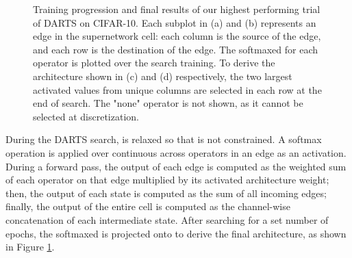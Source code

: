 \documentclass[letterpaper]{article} \usepackage{aaai22}  \usepackage{times}  \usepackage{helvet}  \usepackage{courier}  \usepackage[hyphens]{url}  \usepackage{graphicx} \urlstyle{rm} \def\UrlFont{\rm}  \usepackage{natbib}  \usepackage{caption} \DeclareCaptionStyle{ruled}{labelfont=normalfont,labelsep=colon,strut=off} \frenchspacing  \setlength{\pdfpagewidth}{8.5in}  \setlength{\pdfpageheight}{11in}  \usepackage{algorithm}
\begin{document}
\begin{figure}[ht!]
\begin{minipage}{.9\linewidth}
\centering
{} \end{minipage}\par
\begin{minipage}{.9\linewidth}
\centering
{}
\end{minipage}\par
\begin{minipage}{.395\linewidth}
\centering
{}
 \end{minipage}
\begin{minipage}{.595\linewidth}
\centering
{}
 \end{minipage}\small
\caption{Training progression and final results of our highest performing trial of DARTS on CIFAR-10. Each subplot in (a) and (b) represents an edge in the supernetwork cell: each column is the source of the edge, and each row is the destination of the edge. The softmaxed  for each operator is plotted over the search training. To derive the architecture shown in (c) and (d) respectively, the two largest activated  values from unique columns are selected in each row at the end of search. The "none" operator is not shown, as it cannot be selected at discretization.}
\label{fig:darts}
\end{figure}

During the DARTS search,  is relaxed so that  is not constrained. A softmax operation is applied over continuous  across operators in an edge as an activation. During a forward pass, the output of each edge is computed as the weighted sum of each operator on that edge multiplied by its activated architecture weight; then, the output of each state is computed as the sum of all incoming edges; finally, the output of the entire cell is computed as the channel-wise concatenation of each intermediate state. After searching for a set number of epochs, the softmaxed  is projected onto  to derive the final architecture, as shown in Figure \ref{fig:darts}.
\end{document}
